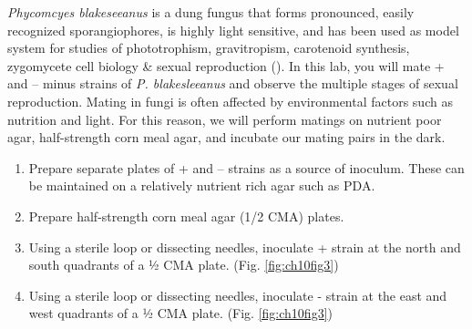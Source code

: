 \documentclass[]{book}
\providecommand{\tightlist}{%
  \setlength{\itemsep}{0pt}\setlength{\parskip}{0pt}}
\begin{document}
\emph{Phycomcyes blakeseeanus} is a dung fungus that forms pronounced, easily recognized sporangiophores, is highly light sensitive, and has been used as model system for studies of phototrophism, gravitropism, carotenoid synthesis, zygomycete cell biology \& sexual reproduction (\citet{Bergman_1969}). In this lab, you will mate + and -- minus strains of \emph{P. blakesleeanus} and observe the multiple stages of sexual reproduction. Mating in fungi is often affected by environmental factors such as nutrition and light. For this reason, we will perform matings on nutrient poor agar, half-strength corn meal agar, and incubate our mating pairs in the dark.

\begin{enumerate}
\def\labelenumi{\arabic{enumi}.}
\tightlist
\item
  Prepare separate plates of + and -- strains as a source of inoculum. These can be maintained on a relatively nutrient rich agar such as PDA.
\item
  Prepare half-strength corn meal agar (1/2 CMA) plates.
\item
  Using a sterile loop or dissecting needles, inoculate + strain at the north and south quadrants of a ½ CMA plate. (Fig. \ref{fig:ch10fig3})
\item
  Using a sterile loop or dissecting needles, inoculate - strain at the east and west quadrants of a ½ CMA plate. (Fig. \ref{fig:ch10fig3})
\end{enumerate}
\end{document}

